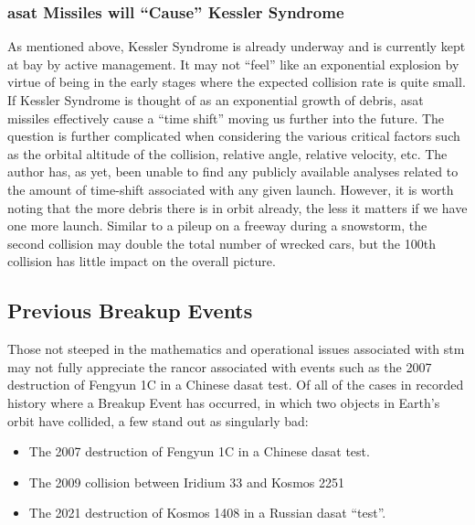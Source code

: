\subsubsection{\ac{asat} Missiles will ``Cause'' Kessler Syndrome}
As mentioned above, Kessler Syndrome is already underway and is
currently kept at bay by active management.  It may not ``feel'' like
an exponential explosion by virtue of being in the early stages where
the expected collision rate is quite small.  If Kessler Syndrome is
thought of as an exponential growth of debris, \ac{asat} missiles
effectively cause a ``time shift'' moving us further into the future.
The question is further complicated when considering the various
critical factors such as the orbital altitude of the collision,
relative angle, relative velocity, etc.  The author has, as yet, been
unable to find any publicly available analyses related to the amount
of time-shift associated with any given launch.  However, it is worth
noting that the more debris there is in orbit already, the less it
matters if we have one more launch.  Similar to a pileup on a freeway
during a snowstorm, the second collision may double the total number
of wrecked cars, but the 100th collision has little impact on the
overall picture.

\subsection{Previous Breakup Events}

Those not steeped in the mathematics and operational issues associated
with \ac{stm} may not fully appreciate the rancor associated with
events such as the 2007 destruction of Fengyun 1C in a Chinese
\ac{dasat} test.  Of all of the cases in recorded history where a
Breakup Event has occurred, in which two objects in Earth's orbit have
collided, a few stand out as singularly bad:

\begin{itemize}

\item The 2007 destruction of Fengyun 1C in a Chinese \ac{dasat} test.

\item The 2009 collision between Iridium 33 and Kosmos 2251

\item The 2021 destruction of Kosmos 1408 in a Russian \ac{dasat} ``test''.

\end{itemize}

